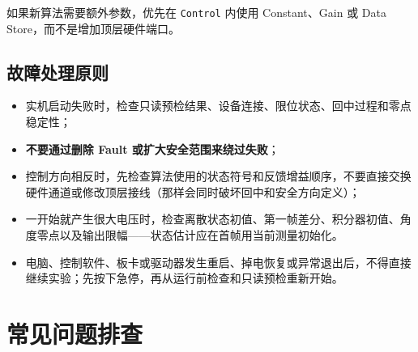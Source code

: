 \documentclass[12pt,a4paper]{article}
\begin{document}
\begin{tipbox}
    如果新算法需要额外参数，优先在 \texttt{Control} 内使用 Constant、Gain 或 Data Store，而不是增加顶层硬件端口。
\end{tipbox}

\subsection{故障处理原则}

\begin{itemize}
    \item 实机启动失败时，检查只读预检结果、设备连接、限位状态、回中过程和零点稳定性；
    \item \textbf{不要通过删除 Fault 或扩大安全范围来绕过失败}；
    \item 控制方向相反时，先检查算法使用的状态符号和反馈增益顺序，不要直接交换硬件通道或修改顶层接线（那样会同时破坏回中和安全方向定义）；
    \item 一开始就产生很大电压时，检查离散状态初值、第一帧差分、积分器初值、角度零点以及输出限幅——状态估计应在首帧用当前测量初始化。
    \item 电脑、控制软件、板卡或驱动器发生重启、掉电恢复或异常退出后，不得直接继续实验；先按下急停，再从运行前检查和只读预检重新开始。
\end{itemize}

\section{常见问题排查}
\label{sec:faq}
\end{document}
